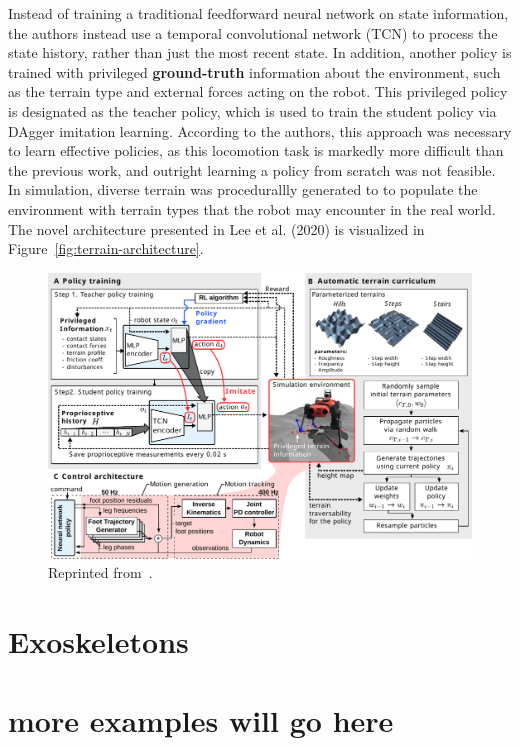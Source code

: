 \documentclass[12pt]{report}
\theoremstyle{definition}
\theoremstyle{remark}
\begin{document}
Instead of training a traditional feedforward neural network on state information, the authors instead use a temporal convolutional network (TCN) to process the state history, rather than just the most recent state. In addition, another policy is trained with privileged \textbf{ground-truth} information about the environment, such as the terrain type and external forces acting on the robot. This privileged policy is designated as the teacher policy, which is used to train the student policy via DAgger imitation learning. According to the authors, this approach was necessary to learn effective policies, as this locomotion task is markedly more difficult than the previous work, and outright learning a policy from scratch was not feasible. In simulation, diverse terrain was procedurallly generated to to populate the environment with terrain types that the robot may encounter in the real world. The novel architecture presented in Lee et al. (2020) is visualized in Figure~\ref{fig:terrain-architecture}.
\begin{figure}[h]
    \centering
    \includegraphics[width=\linewidth]{figs/figure4.pdf}
    \caption{Reprinted from~\cite{lee_learning_2020}.}
    \label{fig:anymal-terrain-architecture}
\end{figure}

\cite{hutter_legged_2022}

\section{Exoskeletons}
\cite{luo_reinforcement_2021}
\cite{luo_experiment-free_2024}


\section{more examples will go here}
\end{document}
